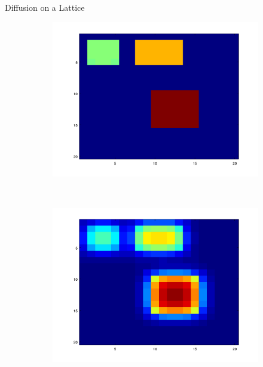 \documentclass{beamer}
\begin{document}
\begin{frame}{Diffusion on a Lattice}
	
\begin{figure}[!h]
	\centering
	\begin{subfigure}[b]{0.25\textwidth}
		\includegraphics[width=\textwidth]{images/anim_0.png}
	\end{subfigure}~
	\begin{subfigure}[b]{0.25\textwidth}
		\includegraphics[width= \textwidth]{images/anim_15.png}
	\end{subfigure}~
	\begin{subfigure}[b]{0.25\textwidth}

\end{subfigure}
\end{figure}
\end{frame}
\end{document}
